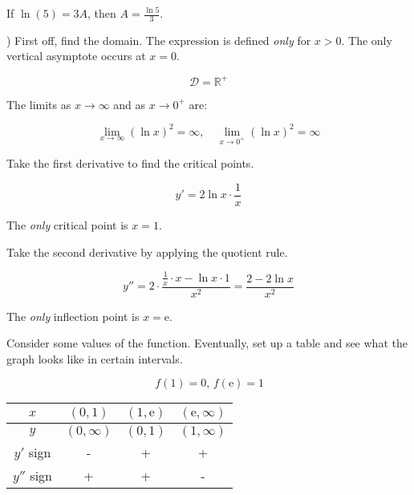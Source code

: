 \documentclass{article}
\begin{document}
\hfill

\noindent If $\ln(5) = 3A$, then $\boxed{A =\frac{\ln5}3}$.

\hfill

) First off, find the domain. The expression is defined \textit{only} for $x>0$. The only vertical asymptote occurs at $x=0$.

\[\mathcal{D} = \mathbb{R}^+\]

\hfill

\noindent The limits as $x\to\infty$ and as $x\to0^+$ are:

\[\lim_{x\to \infty}(\ln x)^2=\infty,\quad \lim_{x\to0^+}(\ln x)^2=\infty \]

\hfill

\noindent Take the first derivative to find the critical points.

\[y'=2\ln x\cdot\frac1x\]

\hfill

\noindent The \textit{only} critical point is $x=1$.

\hfill

\noindent Take the second derivative by applying the quotient rule.

\[y''=2\cdot\frac{\frac1x \cdot x-\ln x \cdot 1}{x^2}=\frac{2-2\ln x}{x^2}\]

\hfill

\noindent The \textit{only} inflection point is $x=\mathrm{e}$.

\hfill

\noindent Consider some values of the function. Eventually, set up a table and see what the graph looks like in certain intervals.

\[\,f\left(1\right)=0,\,f(\mathrm{e})=1\]

\begin{center}
    \large
    \begin{tabular}{ |c| c c c| } 
    \hline
        $x$ & $\left(0, 1\right)$ & $\left(1, \mathrm{e}\right)$&$\left(\mathrm{e}, \infty\right)$  \\
        \hline
        $y$ & $(0, \infty)$ &$(0,1)$ & $(1, \infty)$ \\
        \hline
        $y'$ sign & - & + & + \\
        \hline
        $y''$ sign & + & + & - \\
        \hline
    \end{tabular}
\end{center}

\hfill
\end{document}
